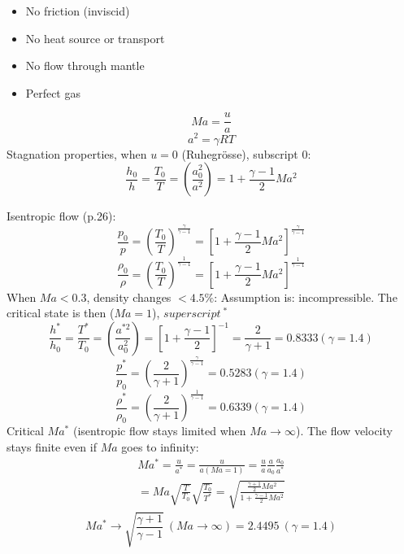 \documentclass[8pt, landscape, fleqn]{scrartcl}
\begin{document}
\begin{multicols*}{3}
\begin{itemize}
    \item No friction (inviscid)
    \item No heat source or transport
    \item No flow through mantle
    \item Perfect gas
\end{itemize}
\begin{equation*}
    Ma = \frac{u}{a}
\end{equation*}
\begin{equation*}
    a^2 = \gamma R T 
\end{equation*}
Stagnation properties, when $u=0$ (Ruhegrösse), subscript 0: 
\begin{equation*}
    \frac{h_0}{h} = \frac{T_0}{T} = \left( \frac{a_0^2}{a^2}\right) = 1 + \frac{\gamma - 1}{2} Ma^2
\end{equation*}

Isentropic flow (p.26):
\begin{equation*}
    \frac{p_0}{p} = \left( \frac{T_0}{T}\right)^{\frac{\gamma}{\gamma -1}} = \left[ 1 + \frac{\gamma-1}{2} Ma^2 \right]^{\frac{\gamma}{\gamma-1}}
\end{equation*}
\begin{equation*}
    \frac{\rho_0}{\rho} = \left( \frac{T_0}{T} \right)^{\frac{1}{\gamma-1}} = \left[ 1 + \frac{\gamma-1}{2} Ma^2 \right]^{\frac{1}{\gamma-1}}
\end{equation*}
When $Ma < 0.3$, density changes $< 4.5 \%$: Assumption is: incompressible. The critical state is then ($Ma = 1$), $superscript~^*$
\begin{equation*}
    \frac{h^*}{h_0} = \frac{T^*}{T_0} = \left( \frac{a^{*2}}{a_0^2}\right) = \left[ 1 + \frac{\gamma -1 }{2}\right]^{-1} = \frac{2}{\gamma+1} = 0.8333 (\gamma = 1.4)
\end{equation*}
\begin{equation*}
    \frac{p^*}{p_0} = \left( \frac{2}{\gamma+1} \right)^{\frac{\gamma}{\gamma-1}} = 0.5283 (\gamma = 1.4)
\end{equation*}
\begin{equation*}
    \frac{\rho^*}{\rho_0} = \left( \frac{2}{\gamma+1} \right)^{\frac{1}{\gamma-1}} = 0.6339 (\gamma = 1.4)
\end{equation*}
Critical $Ma^*$ (isentropic flow stays limited when $Ma \rightarrow \infty$). The flow velocity stays finite even if $Ma$ goes to infinity:
\begin{align*}
    Ma^* = \frac{u}{a^*} = \frac{u}{a(Ma=1)} = \frac{u}{a}\frac{a}{a_0}\frac{a_0}{a^*} \\
    = Ma \sqrt{\frac{T}{T_0}}\sqrt{\frac{T_0}{T^*}} = \sqrt{\frac{\frac{\gamma+1}{2}Ma^2}{1+\frac{\gamma-1}{2}Ma^2}}
\end{align*}
\begin{equation*}
    Ma^* \rightarrow \sqrt{\frac{\gamma+1}{\gamma-1}}~(Ma \rightarrow \infty) = 2.4495~(\gamma = 1.4)
\end{equation*}


\end{multicols*}
\end{document}
